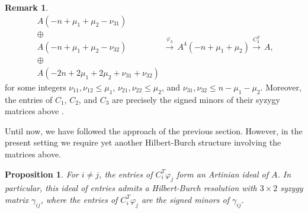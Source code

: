 \documentclass[reqno]{amsart}
\newtheorem{prop}[thm]{Proposition}
\numberwithin{equation}{section}
\theoremstyle{definition}
\newtheorem{rem}[thm]{Remark}
\begin{document}
\begin{rem}
\begin{equation}
\begin{array}{c}
 A(-n+\mu_1+\mu_2 - \nu_{31})\\
 \oplus \\
A(-n+\mu_1+\mu_2 - \nu_{32})\\
\oplus\\
A(-2n+2\mu_1+2\mu_2 + \nu_{31} + \nu_{32})
\end{array} \overset{\varphi_3}{\longrightarrow} \,
A^4(-n+\mu_1+\mu_2)\overset{C_3^T}{\longrightarrow} \,
A,
\end{equation}
for some integers $\nu_{11},\nu_{12}\leq \mu_1$, $\nu_{21},\nu_{22}\leq \mu_2$, and $\nu_{31},\nu_{32}\leq n-\mu_1-\mu_2$. Moreover, the entries of $C_1$, $C_2$, and $C_3$ are precisely the signed minors of their syzygy matrices above \cite[20.15]{Eisenbud}.
\end{rem}

Until now, we have followed the approach of the previous section. However, in the present setting we require yet another Hilbert-Burch structure involving the matrices above.





\begin{prop}\label{C_i^Tphi_j Artinian so HB}
For $i\neq j$, the entries of $C_i^T\varphi_j$ form an Artinian ideal of $A$. In particular, this ideal of entries admits a Hilbert-Burch resolution with $3\times 2$ syzygy matrix $\gamma_{ij}$, where the entries of $C_i^T\varphi_j$ are the signed minors of $\gamma_{ij}$.
\end{prop}
\end{document}
